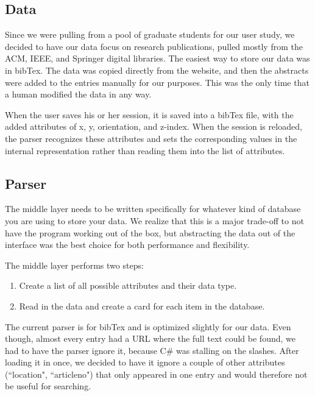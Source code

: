 \documentclass{article}
\begin{document}
\subsection*{Data}

Since we were pulling from a pool of graduate students for our user study, we decided to have our data focus on research publications, pulled mostly from the ACM, IEEE, and Springer digital libraries.  The easiest way to store our data was in bibTex.  The data was copied directly from the website, and then the abstracts were added to the entries manually for our purposes.  This was the only time that a human modified the data in any way.

When the user saves his or her session, it is saved into a bibTex file, with the added attributes of x, y, orientation, and z-index.  When the session is reloaded, the parser recognizes these attributes and sets the corresponding values in the internal representation rather than reading them into the list of attributes.  


\subsection*{Parser}

The middle layer needs to be written specifically for whatever kind of database you are using to store your data.  We realize that this is a major trade-off to not have the program working out of the box, but abstracting the data out of the interface was the best choice for both performance and flexibility. 

The middle layer performs two steps:
\begin{enumerate}
\item{Create a list of all possible attributes and their data type.}
\item{Read in the data and create a card for each item in the database.} 
\end{enumerate}


The current parser is for bibTex and is optimized slightly for our data.  Even though, almost every entry had a URL where the full text could be found, we had to have the parser ignore it, because C\# was stalling on the slashes.  After loading it in once, we decided to have it ignore a couple of other attributes (``location", ``articleno") that only appeared in one entry and would therefore not be useful for searching.

\end{document}
